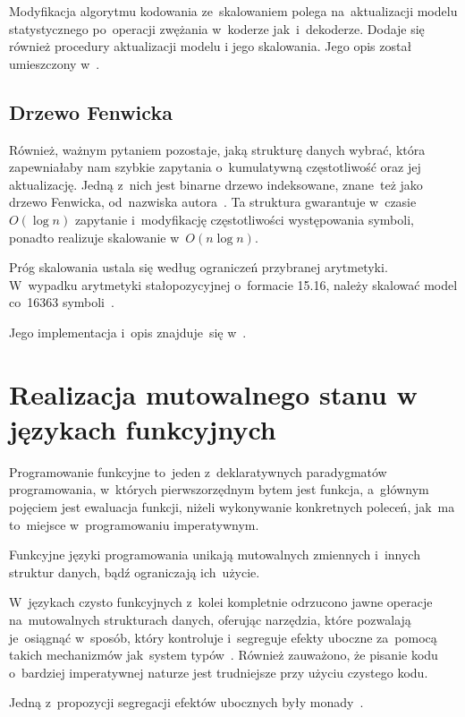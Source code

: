 \documentclass[../../thesis.tex]{subfiles}
\begin{document}
Modyfikacja algorytmu kodowania ze~skalowaniem polega na~aktualizacji
modelu statystycznego po~operacji zwężania w~koderze jak~i~dekoderze.
Dodaje się również procedury aktualizacji modelu i jego skalowania.
Jego opis został umieszczony w~\cite{Sayood:IDC}.

\subsection{Drzewo Fenwicka}

Również, ważnym pytaniem pozostaje, jaką strukturę danych wybrać, która
zapewniałaby nam szybkie zapytania o~kumulatywną częstotliwość oraz
jej aktualizację. Jedną z~nich jest binarne drzewo indeksowane, 
znane~też jako drzewo Fenwicka, od~nazwiska autora~\cite{Fenwick:FT}.
Ta struktura gwarantuje w~czasie~\( O (\log n) \) zapytanie i~modyfikację
częstotliwości występowania symboli, ponadto realizuje skalowanie w~\( O (n \log n) \).

Próg skalowania ustala się według ograniczeń przybranej arytmetyki. 
W~wypadku arytmetyki stałopozycyjnej o~formacie 15.16, należy skalować
model co~16363 symboli~\cite{Fenwick:FT}.

Jego implementacja i~opis znajduje~się w~\cite{Fenwick:FT}.

\section{Realizacja mutowalnego stanu w językach funkcyjnych}

Programowanie funkcyjne to~jeden z~deklaratywnych paradygmatów programowania,
w~których pierwszorzędnym bytem jest funkcja, a~głównym pojęciem
jest ewaluacja funkcji, niżeli wykonywanie konkretnych poleceń,
jak~ma to~miejsce w~programowaniu imperatywnym.~\cite{Hudak:Conception}

Funkcyjne języki programowania unikają mutowalnych zmiennych i~innych 
struktur danych, bądź ograniczają ich~użycie.

W~językach czysto funkcyjnych z~kolei kompletnie odrzucono
jawne operacje na~mutowalnych strukturach danych, oferując narzędzia,
które pozwalają je~osiągnąć w~sposób, który kontroluje i~segreguje
efekty uboczne za~pomocą takich mechanizmów jak~system typów~\cite{Hudak:Conception}.
Również zauważono, że pisanie kodu o~bardziej imperatywnej naturze jest
trudniejsze przy użyciu czystego kodu.

Jedną z~propozycji segregacji efektów ubocznych były monady~\cite{Wadler:MFP}.
\end{document}
